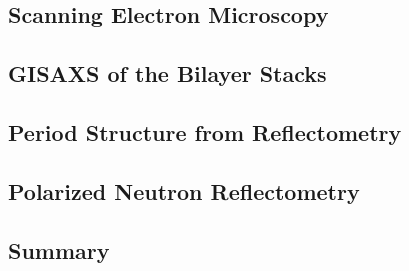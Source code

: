 \documentclass[\main/dresen_thesis.tex]{subfiles}
\renewcommand{\thisPath}{\main/chapters/looselyPackedNS/bilayerStacks}
\begin{document}
  \subsection{Scanning Electron Microscopy}
  
    \FloatBarrier

  \subsection{GISAXS of the Bilayer Stacks}
  
    \FloatBarrier

  \subsection{Period Structure from Reflectometry}
  
    \FloatBarrier

  \subsection{Polarized Neutron Reflectometry}
  
    \FloatBarrier

  \subsection{Summary}
  
    \FloatBarrier
\end{document}
